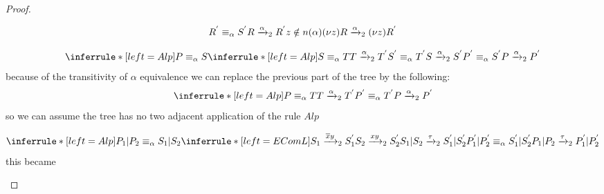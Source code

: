 \begin{theorem}
\begin{proof}
\begin{description}
\begin{description}
\[{{		      R^{'}\equiv_{\alpha} S^{'}
		  }{
		    R\xrightarrow{\alpha}_{2}R^{'}
		  }
		\\
		  z\notin n(\alpha)
	      }{
		(\nu z) R \xrightarrow{\alpha}_{2} (\nu z) R^{'}
	      }
	    \]
	  \item[Alp]
	    \[
	      \inferrule* [left=Alp]{
		  P\equiv_{\alpha}S
		\\
		  \inferrule* [left=Alp]{
		      S\equiv_{\alpha}T
		    \\
		      T\xrightarrow{\alpha}_{2}T^{'}
		    \\
		      S^{'}\equiv_{\alpha}T^{'}
		  }{
		    S \xrightarrow{\alpha}_{2} S^{'}
		  }
		\\
		  P^{'}\equiv_{\alpha} S^{'}
	      }{
		P \xrightarrow{\alpha}_{2} P^{'}
	      }
	    \]
	    because of the transitivity of $\alpha$ equivalence we can replace the previous part of the tree by the following:
	    \[
	      \inferrule* [left=Alp]{
		  P\equiv_{\alpha}T
		\\
		  T \xrightarrow{\alpha}_{2} T^{'}
		\\
		  P^{'}\equiv_{\alpha} T^{'}
	      }{
		P \xrightarrow{\alpha}_{2} P^{'}
	      }
	    \]
	    so we can assume the tree has no two adjacent application of the rule $Alp$
	  \item[EComL]
	    \[
	      \inferrule* [left=Alp]{
		  P_{1}|P_{2}\equiv_{\alpha}S_{1}|S_{2}
		\\
		  \inferrule* [left=EComL]{
		      S_{1}\xrightarrow{\overline{x}y}_{2}S_{1}^{'}
		    \\
		      S_{2}\xrightarrow{xy}_{2}S_{2}^{'}
		  }{
		    S_{1}|S_{2} \xrightarrow{\tau}_{2} S_{1}^{'}|S_{2}^{'}
		  }
		\\
		  P_{1}^{'}|P_{2}^{'}\equiv_{\alpha}S_{1}^{'}|S_{2}^{'}
	      }{
		P_{1}|P_{2} \xrightarrow{\tau}_{2} P_{1}^{'}|P_{2}^{'}
	      }
	    \]
	    this became


\end{description}
\end{description}
\end{proof}
\end{theorem}

